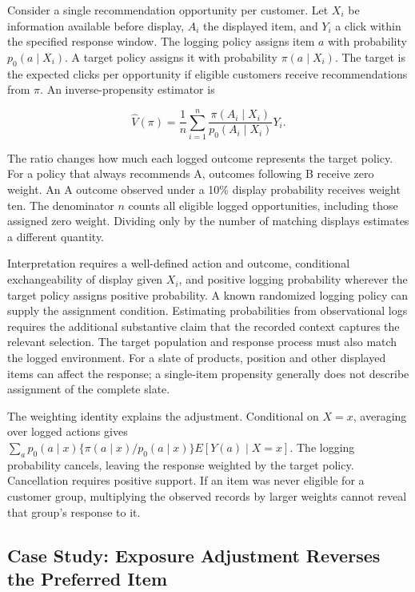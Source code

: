 Consider a single recommendation opportunity per customer. Let \(X_i\)
be information available before display, \(A_i\) the displayed item, and
\(Y_i\) a click within the specified response window. The logging policy
assigns item \(a\) with probability \(p_0(a\mid X_i)\). A target policy
assigns it with probability \(\pi(a\mid X_i)\). The target is the
expected clicks per opportunity if eligible customers receive
recommendations from \(\pi\). An inverse-propensity estimator is

\[
\widehat V(\pi)=\frac{1}{n}\sum_{i=1}^{n}
\frac{\pi(A_i\mid X_i)}{p_0(A_i\mid X_i)}Y_i.
\]

The ratio changes how much each logged outcome represents the target
policy. For a policy that always recommends A, outcomes following B
receive zero weight. An A outcome observed under a 10\% display
probability receives weight ten. The denominator \(n\) counts all
eligible logged opportunities, including those assigned zero weight.
Dividing only by the number of matching displays estimates a different
quantity.

Interpretation requires a well-defined action and outcome, conditional
exchangeability of display given \(X_i\), and positive logging
probability wherever the target policy assigns positive probability. A
known randomized logging policy can supply the assignment condition.
Estimating probabilities from observational logs requires the additional
substantive claim that the recorded context captures the relevant
selection. The target population and response process must also match
the logged environment. For a slate of products, position and other
displayed items can affect the response; a single-item propensity
generally does not describe assignment of the complete slate.

The weighting identity explains the adjustment. Conditional on \(X=x\),
averaging over logged actions gives
\(\sum_a p_0(a\mid x)\{\pi(a\mid x)/p_0(a\mid x)\}E[Y(a)\mid X=x]\). The
logging probability cancels, leaving the response weighted by the target
policy. Cancellation requires positive support. If an item was never
eligible for a customer group, multiplying the observed records by
larger weights cannot reveal that group's response to it.

\hypertarget{M06-case-study-exposure-adjustment-reverses-the-preferred-item}{%
\subsection{Case Study: Exposure Adjustment Reverses the Preferred
Item}\label{M06-case-study-exposure-adjustment-reverses-the-preferred-item}}

